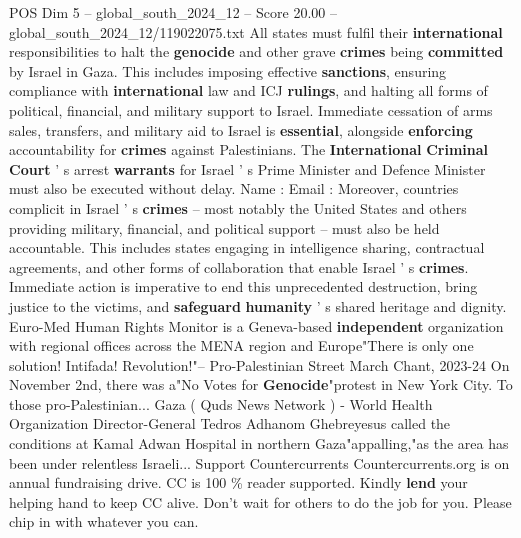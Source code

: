 \begin{textsample}{POS Dim 5 – global\_south\_2024\_12 – Score 20.00 – global\_south\_2024\_12/119022075.txt}
All states must fulfil their \textbf{international} responsibilities to halt the \textbf{genocide} and other grave \textbf{crimes} being \textbf{committed} by Israel in Gaza.
This includes imposing effective \textbf{sanctions}, ensuring compliance with \textbf{international} law and ICJ \textbf{rulings}, and halting all forms of political, financial, and military support to Israel.
Immediate cessation of arms sales, transfers, and military aid to Israel is \textbf{essential}, alongside \textbf{enforcing} accountability for \textbf{crimes} against Palestinians.
The \textbf{International} \textbf{Criminal} \textbf{Court} ' s arrest \textbf{warrants} for Israel ' s Prime Minister and Defence Minister must also be executed without delay.
Name : Email : Moreover, countries complicit in Israel ' s \textbf{crimes} -- most notably the United States and others providing military, financial, and political support -- must also be held accountable.
This includes states engaging in intelligence sharing, contractual agreements, and other forms of collaboration that enable Israel ' s \textbf{crimes}.
Immediate action is imperative to end this unprecedented destruction, bring justice to the victims, and \textbf{safeguard} \textbf{humanity} ' s shared heritage and dignity.
Euro-Med Human Rights Monitor is a Geneva-based \textbf{independent} organization with regional offices across the MENA region and Europe"There is only one solution!
Intifada!
Revolution!"-- Pro-Palestinian Street March Chant, 2023-24 On November 2nd, there was a"No Votes for \textbf{Genocide}"protest in New York City.
To those pro-Palestinian...
Gaza ( Quds News Network ) - World Health Organization Director-General Tedros Adhanom Ghebreyesus called the conditions at Kamal Adwan Hospital in northern Gaza"appalling,"as the area has been under relentless Israeli...
Support Countercurrents Countercurrents.org is on annual fundraising drive.
CC is 100 \% reader supported.
Kindly \textbf{lend} your helping hand to keep CC alive.
Don't wait for others to do the job for you.
Please chip in with whatever you can.

\end{textsample}
